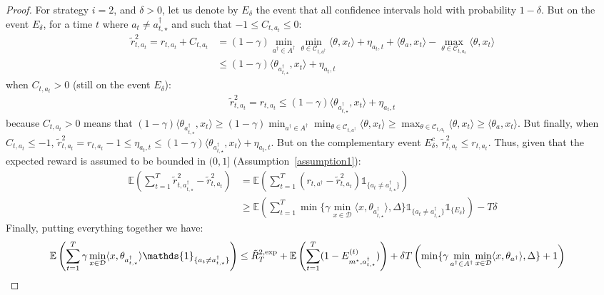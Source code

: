 \begin{proof}
For strategy $i=2$, and $\delta>0$, let us denote by $E_{\delta}$ the event that all confidence intervals hold with probability $1 - \delta$. But on the event $E_{\delta}$, for a time $t$ where $a_{t}\neq a^{\dagger}_{t,\star}$ and such that $-1\leq C_{t,a_{t}} \leq 0$:
\begin{align*}
\tilde{r}^{2}_{t,a_{t}} = r_{t, a_{t}} + C_{t,a_{t}} &= (1 - \gamma)\min_{a^{\dagger}\in A^{\dagger}} \min_{\theta\in \mathcal{C}_{t,a^{\dagger}}} \langle \theta, x_{t}\rangle + \eta_{a_{t},t} + \langle\theta_{a}, x_{t}\rangle - \max_{\theta\in \mathcal{C}_{t,a_{t}}} \langle \theta, x_{t}\rangle \\
&\leq (1 - \gamma) \langle \theta_{a^{\dagger}_{t,\star}}, x_{t}\rangle + \eta_{a_{t},t}
\end{align*}
when $C_{t,a_{t}} >0$ (still on the event $E_{\delta}$):
\begin{align*}
\tilde{r}^{2}_{t,a_{t}} = r_{t,a_{t}} \leq (1 - \gamma) \langle \theta_{a^{\dagger}_{t,\star}}, x_{t}\rangle + \eta_{a_{t},t}
\end{align*}
because $C_{t,a_{t}}>0$ means that $(1 - \gamma) \langle \theta_{a^{\dagger}_{t,\star}}, x_{t}\rangle \geq (1 - \gamma)\min_{a^{\dagger}\in A^{\dagger}}\min_{\theta\in \mathcal{C}_{t,a^{\dagger}}} \langle \theta, x_{t}\rangle \geq \max_{\theta\in \mathcal{C}_{t,a_{t}}} \langle \theta, x_{t}\rangle \geq \langle \theta_{a}, x_{t}\rangle$. But finally, when $C_{t,a_{t}} \leq -1$, $\tilde{r}^{2}_{t,a_{t}} = r_{t,a_{t}} -1 \leq \eta_{a_{t},t} \leq (1- \gamma)\langle \theta_{a^{\dagger}_{t,\star}}, x_{t}\rangle + \eta_{a_{t},t}$.  But on the complementary event $E_{\delta}^{c}$,  $ \tilde{r}^{2}_{t,a_{t}} \leq r_{t,a_t}$. Thus, given that the expected reward is assumed to be bounded in $(0,1]$ (Assumption~\ref{assumption1}):
\begin{align*}
    \mathbb{E}\left(\sum_{t=1}^{T} \tilde{r}^{2}_{t, a^{\dagger}_{t,\star}} - \tilde{r}^{2}_{t,a_{t}} \right) & =  \mathbb{E}\left(\sum_{t=1}^{T} (r_{t, a^{\dagger}} - \tilde{r}^{2}_{t,a_{t}})\mathds{1}_{\{a_{t}\neq a^{\dagger}_{t,\star}\}} \right) \\
    &\geq \mathbb{E}\left(\sum_{t=1}^{T} \min\{\gamma\min_{x\in\mathcal{D}} \langle x, \theta_{a^{\dagger}_{t,\star}}\rangle, \Delta\} \mathds{1}_{\{a_{t}\neq a^{\dagger}_{t,\star}\}}\mathds{1}_{\{E_{\delta}\}}\right)-T\delta
\end{align*}
Finally, putting everything together we have:
\begin{align*}
    \mathbb{E}&\left(\sum_{t=1}^{T} \gamma\min_{x\in\mathcal{D}} \langle x, \theta_{a^{\dagger}_{t,\star}}\rangle \mathds{1}_{\{a_{t}\neq a^{\dagger}_{t,\star}\}}\right) \leq \Tilde{R}_{T}^{2,\text{exp}} + \mathbb{E}\left(\sum_{t=1}^{T}(1 - E_{m^{\star}, a^{\dagger}_{t,\star}}^{(t)})\right) + \delta T \left(\min\{\gamma\min_{a^{\dagger}\in A^{\dagger}}\min_{x\in\mathcal{D}} \langle x, \theta_{a^{\dagger}}\rangle, \Delta\} +1\right)

\end{align*}
\end{proof}
